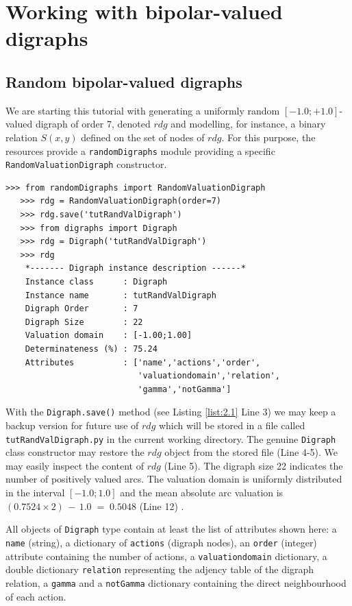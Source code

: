 \chapter{Working with bipolar-valued digraphs}
\label{sec:2}



\section{Random bipolar-valued digraphs}

We are starting this tutorial with generating a uniformly random $[-1.0; +1.0]$-valued digraph of order 7, denoted $rdg$ and modelling, for instance, a binary relation $S(x,y)$ defined on the set of nodes of $rdg$. For this purpose, the \Digraph resources provide a {\tt randomDigraphs} module providing a specific {\tt RandomValuationDigraph} constructor.
\begin{lstlisting}[caption={Random bipolar-valued digraph instance},label=list:2.1]
   >>> from randomDigraphs import RandomValuationDigraph
   >>> rdg = RandomValuationDigraph(order=7)
   >>> rdg.save('tutRandValDigraph')
   >>> from digraphs import Digraph
   >>> rdg = Digraph('tutRandValDigraph')
   >>> rdg
    *------- Digraph instance description ------*
    Instance class      : Digraph
    Instance name       : tutRandValDigraph
    Digraph Order       : 7
    Digraph Size        : 22
    Valuation domain    : [-1.00;1.00]
    Determinateness (%) : 75.24
    Attributes          : ['name','actions','order',
                           'valuationdomain','relation',
                           'gamma','notGamma']
\end{lstlisting}   

With the {\tt Digraph.save()} method (see Listing \ref{list:2.1} Line 3) we may keep a backup version for future use of $rdg$ which will be stored in a file called {\tt tutRandValDigraph.py} in the current working directory. The genuine {\tt Digraph} class constructor may restore the $rdg$ object from the stored file (Line 4-5). We may easily inspect the content of $rdg$ (Line 5). The digraph size 22 indicates the number of positively valued arcs. The valuation domain is uniformly distributed in the interval $[-1.0; 1.0]$ and the mean absolute arc valuation is $(0.7524 \times 2)\, -\, 1.0 \;=\; 0.5048$ (Line 12) .

All objects of {\tt Digraph} type contain at least the list of attributes shown here: a \texttt{name} (string), a dictionary of \texttt{actions} (digraph nodes), an \texttt{order} (integer) attribute containing the number of actions, a \texttt{valuationdomain} dictionary, a double dictionary \texttt{relation} representing the adjency table of the digraph relation, a \texttt{gamma} and a {\tt notGamma} dictionary containing the direct neighbourhood of each action.

